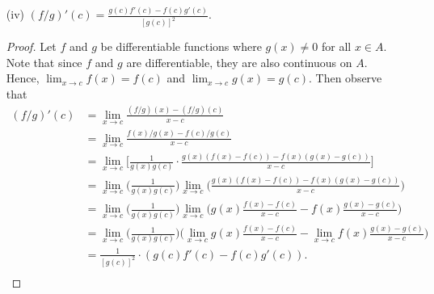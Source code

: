 \begin{enumerate}
\begin{proof}
        \begin{align*}
            (fg)'(c)  &= \lim_{ x \to c  } \frac{ (fg)(x) - (fg)(c) }{ x - c  }  \\
                      &= \lim_{ x \to c  } \frac{ f(x)g(x) - f(c)g(c)  }{ x - c  } \\
                      &= \lim_{ x \to c  } \frac{ f(x)g(x) - f(x)g(c) + f(x)g(c) - f(c)g(c) }{ x - c   } \\
                      &= \lim_{ x \to c  }  \Big(  \frac{ f(x) (g(x) - g(c))  }{ x - c   }  + \frac{  g(c) (f(x) - f(c))  }{ x - c  } \Big) \\ 
                      &= \lim_{ x \to c  } \frac{ f(x) (g(x) - g(c) ) }{ x - c  } + \lim_{ x \to c  } \frac{ g(c) (f(x) - f(c) ) }{ x - c  } \tag{ALFT} \\ 
                      &= \lim_{ x \to c  } f(x)  \Big( \lim_{ x \to c  } \frac{ g(x) - g(c)  }{ x - c  }  \Big) + g(c) \cdot \lim_{ x \to c  } \frac{ f(x) - f(c)  }{ x - c  }   \\
                      &= f(c) g'(c) + g(c)f'(c).
        \end{align*}
        Hence, we have that \( (fg)'(c) = f(c)g'(c) + f'(c)g(c) \).
        \end{proof}
    \item[(iv)] \( (f/g)'(c) = \frac{ g(c)f'(c) - f(c)g'(c)  }{ [g(c)]^2  }  \).
        \begin{proof}
        Let \( f  \) and \( g  \) be differentiable functions where \( g(x) \neq 0  \) for all \( x \in A   \). Note that since \(f \) and \( g  \) are differentiable, they are also continuous on \( A  \). Hence, \( \lim_{ x \to c  } f(x) = f(c)  \) and \( \lim_{ x \to c  } g(x) = g(c)  \). Then observe that 
        \begin{align*}
            (f/g)'(c) &= \lim_{ x \to c  } \frac{ (f/g)(x) - (f/g)(c)  }{ x - c  }  \\
                      &= \lim_{ x \to c  } \frac{ f(x) / g(x) - f(c) / g(c)  }{ x - c  } \\
                      &= \lim_{ x \to c  } \Big[ \frac{ 1 }{ g(x) g(c)  } \cdot \frac{ g(x) (f(x) - f(c)) - f(x) (g(x) - g(c) ) }{ x - c   } \Big] \\ 
                      &= \lim_{ x  \to c  } \Big( \frac{ 1 }{ g(x) g(c) }  \Big) \lim_{ x \to c  } \Big( \frac{ g(x) (f(x) - f(c) )  - f(x) (g(x) - g(c) )}{ x - c  }  \Big) \\
                      &= \lim_{ x \to c  } \Big( \frac{ 1 }{ g(x) g(c)  }  \Big) \lim_{ x \to c  } \Big( g(x) \frac{ f(x) - f(c)  }{ x - c  } - f(x) \frac{ g(x) - g(c)  }{ x - c  }  \Big) \\
                      &= \lim_{ x \to c  } \Big( \frac{ 1 }{ g(x) g(c)  }   \Big) \Big( \lim_{ x \to c  } g(x) \frac{ f(x) - f(c)  }{ x - c  } - \lim_{ x \to c  } f(x) \frac{ g(x) - g(c)  }{ x - c  }  \Big) \\
                      &= \frac{ 1 }{ [g(c)]^2  } \cdot (g(c) f'(c) - f(c)g'(c) ). \\ 
        \end{align*}
        \end{proof}
\end{enumerate}

